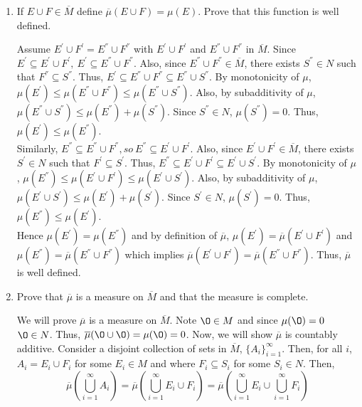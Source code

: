 \begin{enumerate}
\begin{pf}
\end{pf}

\item If $E \cup F \in \overline{M}$ define $\overline{\mu}(E \cup F)= \mu(E)$. Prove that this function is well defined. 
\begin{pf}
Assume $E^{'}\cup F^{'}= E^{''}\cup F^{''}$ with $E^{'}\cup F^{'}$ and $ E^{''}\cup F^{''}$ in $\overline{M}$. Since $E^{'} \subseteq E^{'}\cup F^{'}, \ E^{'} \subseteq E^{''}\cup F^{''}$. Also, since $E^{''}\cup F^{''} \in \overline{M}$, there exists $S^{''} \in N$ such that $F^{''} \subseteq S^{''}$. Thus, $E^{'} \subseteq E^{''}\cup F^{''} \subseteq E^{''}\cup S^{''}$. By monotonicity of $\mu$,  $\mu(E^{'}) \leq \mu(E^{''}\cup F^{''}) \leq \mu(E^{''}\cup S^{''})$. Also, by subadditivity of $\mu$, $\mu(E^{''}\cup S^{''})\leq \mu(E^{''}) + \mu(S^{''})$. Since $S^{''} \in N$, $\mu(S^{''})=0$. Thus, $\mu(E^{'}) \leq \mu(E^{''})$. \\
Similarly, $E^{''} \subseteq E^{''}\cup F^{''}, so \ E^{''} \subseteq E^{'}\cup F^{'}$. Also, since $E^{'}\cup F^{'} \in \overline{M}$, there exists $S^{'} \in N$ such that $F^{'} \subseteq S^{'}$. Thus, $E^{''} \subseteq E^{'}\cup F^{'} \subseteq E^{'}\cup S^{'}$. By monotonicity of $\mu$,  $\mu(E^{''}) \leq \mu(E^{'}\cup F^{'}) \leq \mu(E^{'}\cup S^{'})$. Also, by subadditivity of $\mu$, $\mu(E^{'}\cup S^{'})\leq \mu(E^{'}) + \mu(S^{'})$. Since $S^{'} \in N$, $\mu(S^{'})=0$. Thus, $\mu(E^{''}) \leq \mu(E^{'})$.\\
Hence $\mu(E^{'})=\mu(E^{''})$ and by definition of $\overline{\mu}$, $\mu(E^{'})=\overline{\mu}(E^{'}\cup F^{'})$ and $\mu(E^{''})=\overline{\mu}(E^{''}\cup F^{''})$ which implies $\overline{\mu}(E^{'}\cup F^{'})=\overline{\mu}(E^{''}\cup F^{''})$. Thus, $\overline{\mu}$ is well defined. 
\end{pf}
\item Prove that $\overline{\mu}$ is a measure on $\overline{M}$ and that the measure is complete.
\begin{pf}
We will prove $\overline{\mu}$ is a measure on $\overline{M}$. Note $\O \in M$ and since $\mu(\O) = 0$ $\O \in N$. Thus, $\overline{\mu}(\O \cup \O)= \mu(\O)=0$. Now, we will show $\overline{\mu}$ is countably additive. Consider a disjoint collection of sets in $\overline{M}$, $\{ A_i \}_{i=1}^\infty$. Then, for all $i$, $A_i = E_i \cup F_i$ for some $E_i \in M$ and where $F_i \subseteq S_i$ for some $S_i \in N$. Then, 
\[
\overline{\mu}\left(\bigcup_{i=1}^\infty A_i\right) = \overline{\mu}\left(\bigcup_{i=1}^\infty E_i \cup F_i \right) = \overline{\mu}\left(\bigcup_{i=1}^\infty E_i \cup \bigcup_{i=1}^\infty F_i \right)
\]
\end{pf}
\end{enumerate}
